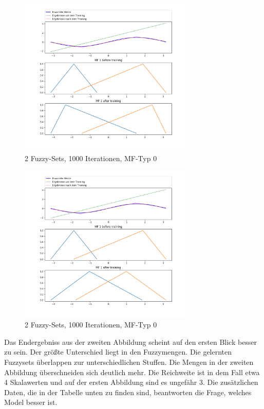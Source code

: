 \begin{figure}[htbp]\label{2mini_batch1000:0}
	\centering
	\includegraphics[width=0.75\textwidth]{images/sinus/Mini-Batch/sinus 1 Input 2 Sets 5000 Epochs Mini-Batch Gradient Descent two equations mf.png}
	\caption{2 Fuzzy-Sets, 1000 Iterationen, MF-Typ 0}
\end{figure}
\begin{figure}[htbp]\label{2mini_batch1000:1}
	\centering
	\includegraphics[width=0.75\textwidth]{images/sinus/Mini-Batch/sinus 1 Input 2 Sets 5000 Epochs Mini-Batch Gradient Descent one equation mf.png}
	\caption{2 Fuzzy-Sets, 1000 Iterationen, MF-Typ 0}
\end{figure}

Das Endergebniss aus der zweiten Abbildung scheint auf den ersten Blick besser zu sein. Der größte Unterschied liegt in den Fuzzymengen. Die gelernten Fuzzysets überlappen zur unterschiedlichen Stuffen. Die Mengen in der zweiten Abbildung überschneiden sich deutlich mehr. Die Reichweite ist in dem Fall etwa 4 Skalawerten und auf der ersten Abbildung sind es ungefähr 3. Die zusätzlichen Daten, die in der Tabelle unten zu finden sind, beantworten die Frage, welches Model besser ist.

